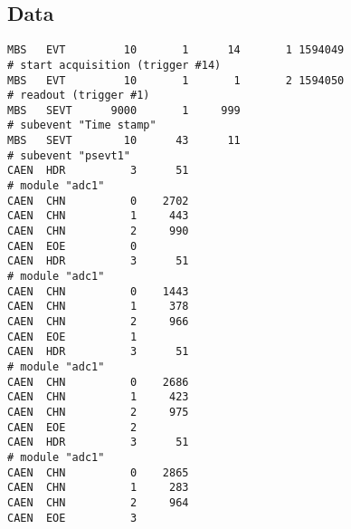 \documentclass[12pt]{article}
\begin{document}
\subsection{Data}
\begin{scriptsize}
\verb+MBS   EVT         10       1      14       1 1594049                         # start acquisition (trigger #14)+\\
\verb+MBS   EVT         10       1       1       2 1594050                         # readout (trigger #1)+\\
\verb+MBS   SEVT      9000       1     999                                         # subevent "Time stamp"+\\
\verb+MBS   SEVT        10      43      11                                         # subevent "psevt1"+\\
\verb+CAEN  HDR          3      51                                                 # module "adc1"+\\
\verb+CAEN  CHN          0    2702+\\
\verb+CAEN  CHN          1     443+\\
\verb+CAEN  CHN          2     990+\\
\verb+CAEN  EOE          0+\\
\verb+CAEN  HDR          3      51                                                 # module "adc1"+\\
\verb+CAEN  CHN          0    1443+\\
\verb+CAEN  CHN          1     378+\\
\verb+CAEN  CHN          2     966+\\
\verb+CAEN  EOE          1+\\
\verb+CAEN  HDR          3      51                                                 # module "adc1"+\\
\verb+CAEN  CHN          0    2686+\\
\verb+CAEN  CHN          1     423+\\
\verb+CAEN  CHN          2     975+\\
\verb+CAEN  EOE          2+\\
\verb+CAEN  HDR          3      51                                                 # module "adc1"+\\
\verb+CAEN  CHN          0    2865+\\
\verb+CAEN  CHN          1     283+\\
\verb+CAEN  CHN          2     964+\\
\verb+CAEN  EOE          3+\\

\end{scriptsize}
\end{document}
